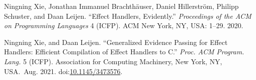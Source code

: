 \documentclass{llncs}
\begin{document}
{\begin{thebibliography}{20}
\mdbibitemlabel{{}[19]}Ningning Xie, Jonathan Immanuel Brachth\"{a}user, Daniel Hillerstr\"{o}m, Philipp Schuster, and Daan Leijen. \textquotedblleft{}Effect Handlers, Evidently.\textquotedblright{} \emph{Proceedings of the ACM on Programming Languages} 4 (ICFP). ACM New York, NY, USA: 1–29. 2020.%

\mdbibitemlabel{{}[20]}Ningning Xie, and Daan Leijen. \textquotedblleft{}Generalized Evidence Passing for Effect Handlers: Efficient Compilation of Effect Handlers to C.\textquotedblright{} \emph{Proc. ACM Program. Lang.} 5 (ICFP). Association for Computing Machinery, New York, NY, USA.~Aug. 2021. doi:\href{https://dx.doi.org/10.1145/3473576}{10.1145/3473576}.%
\par%
\end{thebibliography}}%
\end{document}
